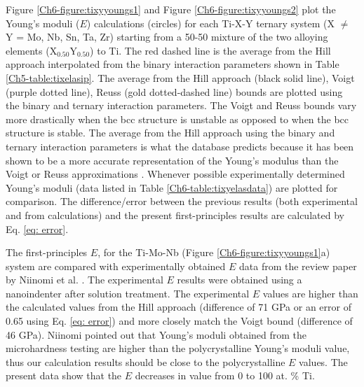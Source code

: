 Figure \ref{Ch6-figure:tixyyoungs1} and Figure \ref{Ch6-figure:tixyyoungs2} plot the Young's moduli ($E$) calculations (circles) for each Ti-X-Y ternary system (X $\neq$ Y = Mo, Nb, Sn, Ta, Zr) starting from a 50-50 mixture of the two alloying elements (X$_{0.50}$Y$_{0.50}$) to Ti. The red dashed line is the average from the Hill approach interpolated from the binary interaction parameters shown in Table \ref{Ch5-table:tixelasip}. The average from the Hill approach (black solid line), Voigt (purple dotted line), Reuss (gold dotted-dashed line) bounds are plotted using the binary and ternary interaction parameters. The Voigt and Reuss bounds vary more drastically when the bcc structure is unstable as opposed to when the bcc structure is stable. The average  from the Hill approach using the binary and ternary interaction parameters is what the database predicts because it has been shown to be a more accurate representation of the Young's modulus than the Voigt or Reuss approximations \cite{Yue2009,Chung1967}. Whenever possible experimentally determined Young's moduli \cite{Niinomi2012,Mohammed2014,Nozoe2007,Geetha2009} (data listed in Table \ref{Ch6-table:tixyelasdata}) are plotted for comparison. The difference/error between the previous results (both experimental and from calculations) and the present first-principles results are calculated by Eq. \ref{eq: error}.

The first-principles $E$, for the Ti-Mo-Nb (Figure \ref{Ch6-figure:tixyyoungs1}a) system are compared with experimentally obtained $E$ data from the review paper by Niinomi et al. \cite{Niinomi2012}. The experimental $E$ results were obtained using a nanoindenter after solution treatment. The experimental $E$ values are higher than the calculated values from the Hill approach (difference of 71 GPa or an error of 0.65 using Eq. \ref{eq: error}) and more closely match the Voigt bound (difference of 46 GPa). Niinomi \cite{Niinomi2012} pointed out that Young's moduli obtained from the microhardness testing are higher than the polycrystalline Young's moduli value, thus our calculation results should be close to the polycrystalline $E$ values. The present data show that the $E$ decreases in value from 0 to 100 at. \% Ti. 

